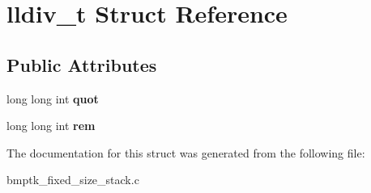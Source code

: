 \hypertarget{structlldiv__t}{}\section{lldiv\+\_\+t Struct Reference}
\label{structlldiv__t}
\subsection*{Public Attributes}
\begin{DoxyCompactItemize}
\item 
long long int {\bfseries quot}\hypertarget{structlldiv__t_aa2c189bf2a4ebe0f680463e4ce32b72f}{}\label{structlldiv__t_aa2c189bf2a4ebe0f680463e4ce32b72f}

\item 
long long int {\bfseries rem}\hypertarget{structlldiv__t_adc99c61028a27673c373ab2815f90a79}{}\label{structlldiv__t_adc99c61028a27673c373ab2815f90a79}

\end{DoxyCompactItemize}


The documentation for this struct was generated from the following file\+:\begin{DoxyCompactItemize}
\item 
bmptk\+\_\+fixed\+\_\+size\+\_\+stack.\+c\end{DoxyCompactItemize}
